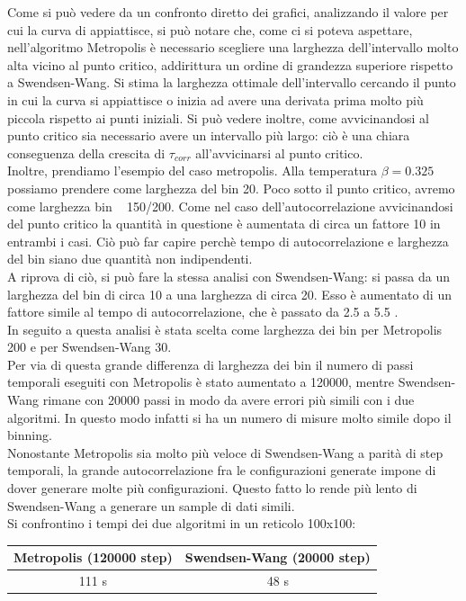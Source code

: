 Come si può vedere da un confronto diretto dei grafici, analizzando il valore per cui la curva di appiattisce, si può notare che, come ci si poteva aspettare, nell'algoritmo Metropolis è necessario scegliere una larghezza dell'intervallo molto alta vicino al punto critico, addirittura un ordine di grandezza superiore rispetto a Swendsen-Wang.
Si stima la larghezza ottimale dell'intervallo cercando il punto in cui la curva si appiattisce o inizia ad avere una derivata prima molto più piccola rispetto ai punti iniziali.
Si può vedere inoltre, come avvicinandosi al punto critico sia necessario avere un intervallo più largo: ciò è una chiara conseguenza della crescita di $\tau_{corr}$ all'avvicinarsi al punto critico.\\
Inoltre, prendiamo l'esempio del caso metropolis. Alla temperatura $\beta = 0.325$ possiamo prendere come larghezza del bin 20. Poco sotto il punto critico, avremo come larghezza bin ~ 150/200. Come nel caso dell'autocorrelazione avvicinandosi del punto critico la quantità in questione è aumentata di circa un fattore 10 in entrambi i casi.
Ciò può far capire perchè tempo di autocorrelazione e larghezza del bin siano due quantità non indipendenti.\\
A riprova di ciò, si può fare la stessa analisi con Swendsen-Wang: si passa da un larghezza del bin di circa 10 a una larghezza di circa 20. Esso è aumentato di un fattore simile al tempo di autocorrelazione, che è passato da 2.5 a 5.5 .\\
In seguito a questa analisi è stata scelta come larghezza dei bin per Metropolis  200 e per Swendsen-Wang 30.\\
Per via di questa grande differenza di larghezza dei bin il numero di passi temporali eseguiti con Metropolis è stato aumentato a 120000, mentre Swendsen-Wang rimane con 20000 passi in modo da avere errori più simili con i due algoritmi. In questo modo infatti si ha un numero di misure molto simile dopo il binning.\\
Nonostante Metropolis sia molto più veloce di Swendsen-Wang a parità di step temporali, la grande autocorrelazione fra le configurazioni generate impone di dover generare molte più configurazioni. Questo fatto lo rende più lento di Swendsen-Wang a generare un sample di dati simili.\\
Si confrontino i tempi dei due algoritmi in un reticolo 100x100:
\\
\begin{center}
\begin{tabular}{cc}
\toprule
	Metropolis (120000 step) & Swendsen-Wang (20000 step) \\
\midrule
	111 s & 48 s \\
\bottomrule
\end{tabular} 
\end{center}

